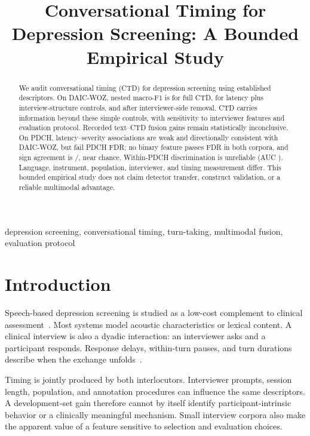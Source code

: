 \documentclass{article}
\title{Conversational Timing for Depression Screening: A Bounded Empirical Study}
\begin{document}
\maketitle
\begin{abstract}
We audit conversational timing (CTD) for depression screening using established descriptors. On DAIC-WOZ, nested macro-F1 is  for full CTD,  for latency plus interview-structure controls, and  after interviewer-side removal. CTD carries information beyond these simple controls, with sensitivity to interviewer features and evaluation protocol. Recorded text--CTD fusion gains remain statistically inconclusive. On PDCH, latency--severity associations are weak and directionally consistent with DAIC-WOZ, but fail PDCH FDR; no binary feature passes FDR in both corpora, and sign agreement is /, near chance. Within-PDCH discrimination is unreliable (AUC ). Language, instrument, population, interviewer, and timing measurement differ. This bounded empirical study does not claim detector transfer, construct validation, or a reliable multimodal advantage.
\end{abstract}
\begin{keywords}
depression screening, conversational timing, turn-taking, multimodal fusion, evaluation protocol
\end{keywords}

\section{Introduction}
Speech-based depression screening is studied as a low-cost complement to clinical assessment~\cite{valstar2016avec,cummins2015review}. Most systems model acoustic characteristics or lexical content. A clinical interview is also a dyadic interaction: an interviewer asks and a participant responds. Response delays, within-turn pauses, and turn durations describe when the exchange unfolds~\cite{yamamoto2020timing,aldeneh2019mood}.

Timing is jointly produced by both interlocutors. Interviewer prompts, session length, population, and annotation procedures can influence the same descriptors. A development-set gain therefore cannot by itself identify participant-intrinsic behavior or a clinically meaningful mechanism. Small interview corpora also make the apparent value of a feature sensitive to selection and evaluation choices.
\end{document}

